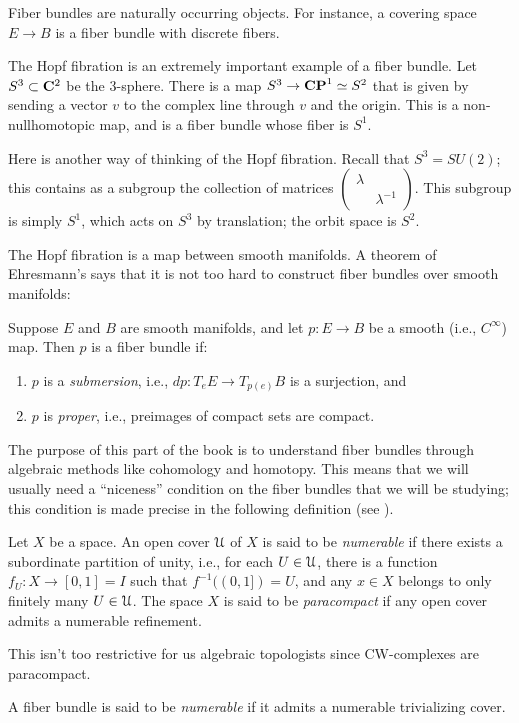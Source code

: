 Fiber bundles are naturally occurring objects.
For instance, a covering space $E\to B$ is a fiber bundle with discrete fibers. 
\begin{example}
    The Hopf fibration is an extremely important example of a fiber bundle.
    Let $S^3\subset \mathbf C^2$ be the $3$-sphere.
    There is a map $S^3\to \mathbf{CP}^1 \simeq S^2$ that is given by sending a vector $v$ to the
    complex line through $v$ and the origin.
    This is a non-nullhomotopic map, and is a fiber bundle whose fiber is $S^1$.
    
    Here is another way of thinking of the Hopf fibration.
    Recall that $S^3 = SU(2)$; this contains as a subgroup
    the collection of matrices $\begin{pmatrix}\lambda & \\ & \lambda^{-1}\end{pmatrix}$.
	This subgroup is simply $S^1$, which acts on $S^3$ by translation; 
	the orbit space is $S^2$.
\end{example}
The Hopf fibration is a map between smooth manifolds.
A theorem of Ehresmann's says that it is not too hard to construct fiber bundles over smooth manifolds:
\begin{theorem}[Ehresmann]
    Suppose $E$ and $B$ are smooth manifolds, and let $p:E\to B$ be a smooth (i.e., $C^\infty$) map.
    Then $p$ is a fiber bundle if:
    \begin{enumerate}
	\item $p$ is a \emph{submersion}, i.e., $dp:T_e E\to T_{p(e)} B$ is a surjection, and
	\item $p$ is \emph{proper}, i.e., preimages of compact sets are compact.
    \end{enumerate}
\end{theorem}
The purpose of this part of the book is to understand fiber bundles through algebraic methods like cohomology and homotopy.
This means that we will usually need a ``niceness'' condition on the fiber bundles that we will be studying;
this condition is made precise in the following definition (see \cite{MayConcise}).
\begin{definition}
    Let $X$ be a space.
    An open cover $\mathcal U$ of $X$ is said to be \emph{numerable}
    if there exists a subordinate partition of unity, i.e.,
    for each $U\in\mathcal U$, there is a function $f_U:X\to [0,1]=I$
    such that $f^{-1}((0,1]) = U$,
    and any $x\in X$ belongs to only finitely many $U\in\mathcal U$.
    The space $X$ is said to be \emph{paracompact} if any open cover admits a numerable refinement.
\end{definition}
This isn't too restrictive for us algebraic topologists since CW-complexes are paracompact.
\begin{definition}
    A fiber bundle is said to be \emph{numerable} if it admits a numerable trivializing cover.
\end{definition}

